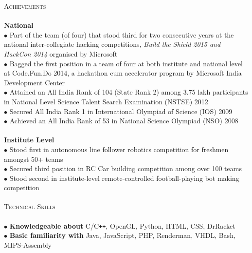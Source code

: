 \documentclass[a4paper,9pt]{article}
\begin{document}
\textcolor{myrust}{\large{\textsc{Achievements}}}\textcolor{mygray}{\sout{\hfill}}\\\\
\small %
\textbf{National}\\
$\bullet$ Part of the team (of four) that stood third for two consecutive years at the national inter-collegiate hacking competitions, \textsl{Build the Shield 2015 and HackCon 2014} organised by Microsoft\\ 
$\bullet$ Bagged the first position in a team of four at both institute and national level at Code.Fun.Do 2014, a hackathon cum accelerator program by Microsoft India Development Center\\ 
$\bullet$ Attained an All India Rank of 104 (State Rank 2) among 3.75 lakh participants in National Level Science Talent Search Examination (NSTSE) 2012\\ 
$\bullet$ Secured All India Rank 1 in International Olympiad of Science (IOS) 2009\\ 
$\bullet$ Achieved an All India Rank of 53 in National Science Olympiad (NSO) 2008\\\\
\textbf{Institute Level}\\
$\bullet$ Stood first in autonomous line follower robotics competition for freshmen amongst 50+ teams\\ 
$\bullet$ Secured third position in RC Car building competition among over 100 teams\\ 
$\bullet$ Stood second in institute-level remote-controlled football-playing bot making competition\\\\

\textcolor{myrust}{\large{\textsc{Technical Skills}}}\textcolor{mygray}{\sout{\hfill}}\\\\
\small %
$\bullet$ \textbf{Knowledgeable about} C/C\verb!++!, OpenGL, Python, HTML, CSS, DrRacket\\
$\bullet$ \textbf{Basic familiarity with} Java, JavaScript, PHP, Renderman, VHDL, Bash, MIPS-Assembly\\\\
\end{document}
